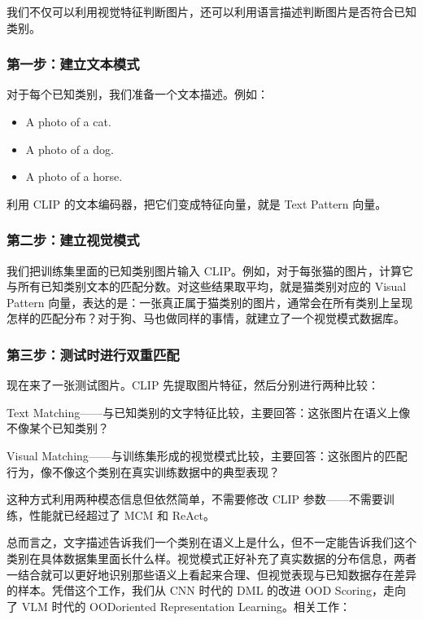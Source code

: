 我们不仅可以利用视觉特征判断图片，还可以利用语言描述判断图片是否符合已知类别。

\subsubsection*{第一步：建立文本模式}

对于每个已知类别，我们准备一个文本描述。例如：

\begin{itemize}
  \item A photo of a cat.
  \item A photo of a dog.
  \item A photo of a horse.
\end{itemize}

利用 CLIP 的文本编码器，把它们变成特征向量，就是 Text Pattern 向量。

\subsubsection*{第二步：建立视觉模式}

我们把训练集里面的已知类别图片输入 CLIP。例如，对于每张猫的图片，计算它与所有已知类别文本的匹配分数。对这些结果取平均，就是猫类别对应的 Visual Pattern 向量，表达的是：一张真正属于猫类别的图片，通常会在所有类别上呈现怎样的匹配分布？对于狗、马也做同样的事情，就建立了一个视觉模式数据库。

\subsubsection*{第三步：测试时进行双重匹配}

现在来了一张测试图片。CLIP 先提取图片特征，然后分别进行两种比较：

Text Matching——与已知类别的文字特征比较，主要回答：这张图片在语义上像不像某个已知类别？

Visual Matching——与训练集形成的视觉模式比较，主要回答：这张图片的匹配行为，像不像这个类别在真实训练数据中的典型表现？

这种方式利用两种模态信息但依然简单，不需要修改 CLIP 参数——不需要训练，性能就已经超过了 MCM 和 ReAct。

总而言之，文字描述告诉我们一个类别在语义上是什么，但不一定能告诉我们这个类别在具体数据集里面长什么样。视觉模式正好补充了真实数据的分布信息，两者一结合就可以更好地识别那些语义上看起来合理、但视觉表现与已知数据存在差异的样本。凭借这个工作，我们从 CNN 时代的 DML 的改进 OOD Scoring，走向了 VLM 时代的 OODoriented Representation Learning。相关工作：

